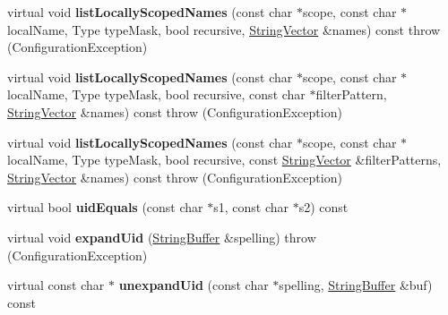 \begin{DoxyCompactItemize}
\item 
\hypertarget{classCONFIG4CPP__NAMESPACE_1_1ConfigurationImpl_a4aa1415b61d5e36a36f3d218cc8572dc}{virtual void {\bfseries list\-Locally\-Scoped\-Names} (const char $\ast$scope, const char $\ast$local\-Name, Type type\-Mask, bool recursive, \hyperlink{classCONFIG4CPP__NAMESPACE_1_1StringVector}{String\-Vector} \&names) const   throw (\-Configuration\-Exception)}\label{classCONFIG4CPP__NAMESPACE_1_1ConfigurationImpl_a4aa1415b61d5e36a36f3d218cc8572dc}

\item 
\hypertarget{classCONFIG4CPP__NAMESPACE_1_1ConfigurationImpl_a871970a1c874e53f80a679bbe4e652ed}{virtual void {\bfseries list\-Locally\-Scoped\-Names} (const char $\ast$scope, const char $\ast$local\-Name, Type type\-Mask, bool recursive, const char $\ast$filter\-Pattern, \hyperlink{classCONFIG4CPP__NAMESPACE_1_1StringVector}{String\-Vector} \&names) const   throw (\-Configuration\-Exception)}\label{classCONFIG4CPP__NAMESPACE_1_1ConfigurationImpl_a871970a1c874e53f80a679bbe4e652ed}

\item 
\hypertarget{classCONFIG4CPP__NAMESPACE_1_1ConfigurationImpl_af48b44d00f90bc916590b6a25c1617d7}{virtual void {\bfseries list\-Locally\-Scoped\-Names} (const char $\ast$scope, const char $\ast$local\-Name, Type type\-Mask, bool recursive, const \hyperlink{classCONFIG4CPP__NAMESPACE_1_1StringVector}{String\-Vector} \&filter\-Patterns, \hyperlink{classCONFIG4CPP__NAMESPACE_1_1StringVector}{String\-Vector} \&names) const   throw (\-Configuration\-Exception)}\label{classCONFIG4CPP__NAMESPACE_1_1ConfigurationImpl_af48b44d00f90bc916590b6a25c1617d7}

\item 
\hypertarget{classCONFIG4CPP__NAMESPACE_1_1ConfigurationImpl_ae167d0095c9ddf16c8db8ecb02b529ca}{virtual bool {\bfseries uid\-Equals} (const char $\ast$s1, const char $\ast$s2) const }\label{classCONFIG4CPP__NAMESPACE_1_1ConfigurationImpl_ae167d0095c9ddf16c8db8ecb02b529ca}

\item 
\hypertarget{classCONFIG4CPP__NAMESPACE_1_1ConfigurationImpl_a92f68f5299d90449a8a1cf88ea48c9b4}{virtual void {\bfseries expand\-Uid} (\hyperlink{classCONFIG4CPP__NAMESPACE_1_1StringBuffer}{String\-Buffer} \&spelling)  throw (\-Configuration\-Exception)}\label{classCONFIG4CPP__NAMESPACE_1_1ConfigurationImpl_a92f68f5299d90449a8a1cf88ea48c9b4}

\item 
\hypertarget{classCONFIG4CPP__NAMESPACE_1_1ConfigurationImpl_a11a9fc281df2a31fd1fa923308882484}{virtual const char $\ast$ {\bfseries unexpand\-Uid} (const char $\ast$spelling, \hyperlink{classCONFIG4CPP__NAMESPACE_1_1StringBuffer}{String\-Buffer} \&buf) const }\label{classCONFIG4CPP__NAMESPACE_1_1ConfigurationImpl_a11a9fc281df2a31fd1fa923308882484}


\end{DoxyCompactItemize}
